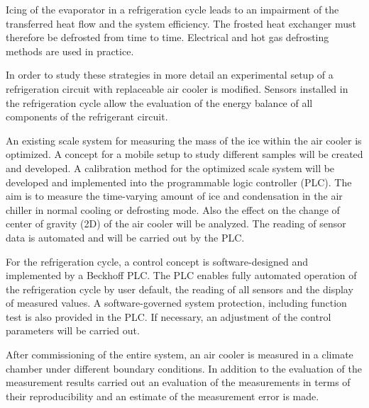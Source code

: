 Icing of the evaporator in a refrigeration cycle leads to an impairment of the transferred heat flow and the system efficiency. The frosted heat exchanger must therefore be defrosted from time to time.  Electrical and hot gas defrosting methods are used in practice.

In order to study  these strategies in more detail an experimental setup of a refrigeration circuit with replaceable air cooler is modified. Sensors installed in the refrigeration cycle allow the evaluation of the energy balance of all components of the refrigerant circuit.

An existing scale system for measuring the mass of the ice within the air cooler is optimized. A concept for a mobile setup to study different samples will be created and developed. A calibration method for the optimized scale system will be developed and implemented into the programmable logic controller (PLC). The aim is to measure the time-varying amount of ice and condensation in the air chiller in normal cooling or defrosting mode.  Also the effect on the change of center of gravity (2D) of the air cooler will be analyzed. The reading of sensor data is automated and will be carried out by the PLC.

For the refrigeration cycle, a control concept is software-designed and implemented by a Beckhoff PLC. The PLC enables fully automated operation of the refrigeration cycle by user default, the reading of all sensors and the display of measured values. A software-governed system protection, including function test is also provided in the PLC. If necessary, an adjustment of the control parameters will be carried out.
 
After commissioning of the entire system, an air cooler is measured in a climate chamber under different boundary conditions. In addition to the evaluation of the measurement results carried out an evaluation of the measurements in terms of their reproducibility and an estimate of the measurement error is made.

